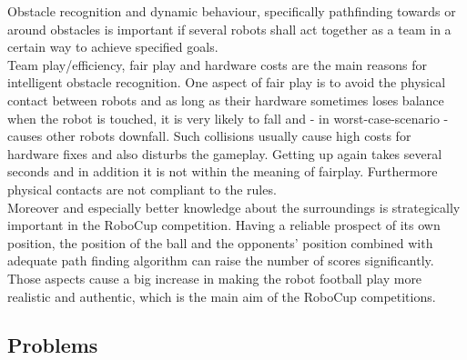 \documentclass[lnicst,a4paper]{svmultln}
\begin{document}
Obstacle recognition and dynamic behaviour, specifically pathfinding towards or around obstacles is important if several robots shall act together as a team in a certain way to achieve specified goals.
\\
Team play/efficiency, fair play and hardware costs are the main reasons for intelligent obstacle recognition. One aspect of fair play is to avoid the physical contact between robots and as long as their hardware sometimes loses balance when the robot is touched, it is very likely to fall and - in worst-case-scenario - causes other robots downfall. Such collisions usually cause high costs for hardware fixes and also disturbs the gameplay. Getting up again takes several seconds and in addition it is not within the meaning of fairplay. Furthermore physical contacts are not compliant to the rules.
\\
Moreover and especially better knowledge about the surroundings is strategically important in the RoboCup competition. Having a reliable prospect of its own position, the position of the ball and the opponents' position combined with adequate path finding algorithm can raise the number of scores significantly.
\\
Those aspects cause a big increase in making the robot football play more realistic and authentic, which is the main aim of the RoboCup competitions.





\subsection{Problems}
\end{document}
